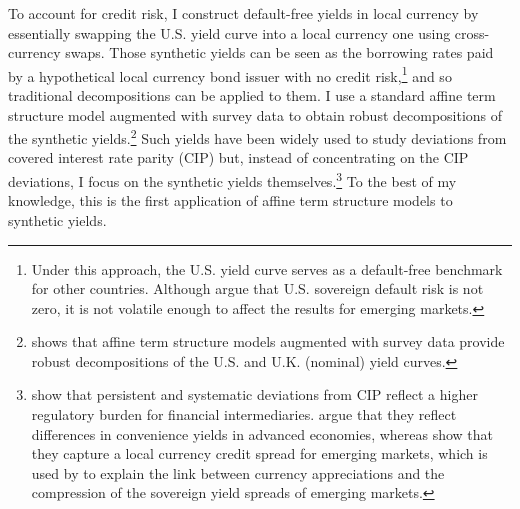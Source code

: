 {To account for credit risk, I construct default-free yields in local currency by essentially swapping the U.S. yield curve into a local currency one using cross-currency swaps. Those synthetic yields can be seen as the borrowing rates paid by a hypothetical local currency bond issuer with no credit risk,\footnote{ Under this approach, the U.S. yield curve serves as a default-free benchmark for other countries. Although \cite{ACCS:2019} argue that U.S. sovereign default risk is not zero, it is not volatile enough to affect the results for emerging markets.} and so traditional decompositions can be applied to them. I use a standard affine term structure model augmented with survey data to obtain robust decompositions of the synthetic yields.\footnote{ \cite{Guimaraes:2014} shows that affine term structure models augmented with survey data provide robust decompositions of the U.S. and U.K. (nominal) yield curves.} Such yields have been widely used to study deviations from covered interest rate parity (CIP) but, instead of concentrating on the CIP deviations, I focus on the synthetic yields themselves.\footnote{ \cite{DuTepperVerdelhan:2018} show that persistent and systematic deviations from CIP reflect a higher regulatory burden for financial intermediaries. \cite{DuImSchreger:2018JIE} argue that they reflect differences in convenience yields in advanced economies, whereas \cite{DuSchreger:2016JoF} show that they capture a local currency credit spread for emerging markets, which is used by \cite{HofmannShimShin:2019} to explain the link between currency appreciations and the compression of the sovereign yield spreads of emerging markets.} To the best of my knowledge, this is the first application of affine term structure models to synthetic yields. 

}
